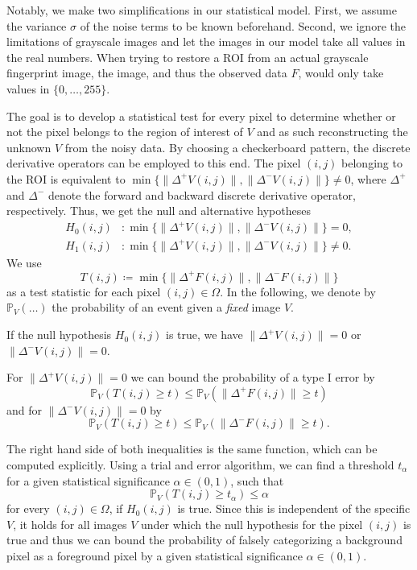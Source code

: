 \documentclass[a4paper,12pt]{article}
\newcommand{\norm}[1]{\lVert#1\rVert}
\theoremstyle{plain}
\theoremstyle{definition}
\begin{document}
Notably, we make two simplifications in our statistical model. First, we assume the variance $\sigma$ of the noise terms to be known beforehand. Second, we ignore the limitations of grayscale images and let the images in our model take all values in the real numbers. When trying to restore a ROI from an actual grayscale fingerprint image, the image, and thus the observed data $F$, would only take values in $\{ 0, \dots, 255 \}$.

The goal is to develop a statistical test for every pixel to determine whether or not the pixel belongs to the region of interest of $V$ and as such reconstructing the unknown $V$ from the noisy data. By choosing a checkerboard pattern, the discrete derivative operators can be employed to this end. The pixel $(i, j)$ belonging to the ROI is equivalent to $\min \{ \norm{\Delta^+ V(i, j)}, \norm{\Delta^- V(i, j)} \} \neq 0$, where $\Delta^+$ and $\Delta^-$ denote the forward and backward discrete derivative operator, respectively. Thus, we get the null and alternative hypotheses
\begin{align*}
	H_0(i, j)&: \min \{ \norm{\Delta^+ V(i, j)}, \norm{\Delta^- V(i, j)} \} = 0, \\
	H_1(i, j)&: \min \{ \norm{\Delta^+ V(i, j)}, \norm{\Delta^- V(i, j)} \} \neq 0.
\end{align*}
We use
\begin{equation*}
	T(i, j) \coloneqq \min \{ \norm{\Delta^+ F(i, j)}, \norm{\Delta^- F(i, j)} \}
\end{equation*}
as a test statistic for each pixel $(i, j) \in \Omega$. In the following, we denote by $\mathbb{P}_V( \ldots )$ the probability of an event given a \emph{fixed} image $V$.

If the null hypothesis $H_0(i, j)$ is true, we have $\norm{\Delta^+ V(i, j)} = 0$ or $\norm{\Delta^- V(i, j)} = 0$.

For $\norm{\Delta^+ V(i, j)} = 0$ we can bound the probability of a type I error by
\begin{equation*}
	\mathbb{P}_V( T(i, j) \geq t ) \leq \mathbb{P}_V( \norm{\Delta^+ F(i, j)} \geq t )
\end{equation*}
and for $\norm{\Delta^- V(i, j)} = 0$ by
\begin{equation*}
	\mathbb{P}_V( T(i, j) \geq t ) \leq \mathbb{P}_V( \norm{\Delta^- F(i, j)} \geq t ).
\end{equation*}

The right hand side of both inequalities is the same function, which can be computed explicitly. Using a trial and error algorithm, we can find a threshold $t_\alpha$ for a given statistical significance $\alpha \in ( 0, 1 )$, such that
\begin{equation*}
	\mathbb{P}_V( T(i, j) \geq t_\alpha ) \leq \alpha
\end{equation*}
for every $(i, j) \in \Omega$, if $H_0(i, j)$ is true. Since this is independent of the specific $V$, it holds for all images $V$ under which the null hypothesis for the pixel $(i, j)$ is true and thus we can bound the probability of falsely categorizing a background pixel as a foreground pixel by a given statistical significance $\alpha \in ( 0, 1 )$.
\end{document}
